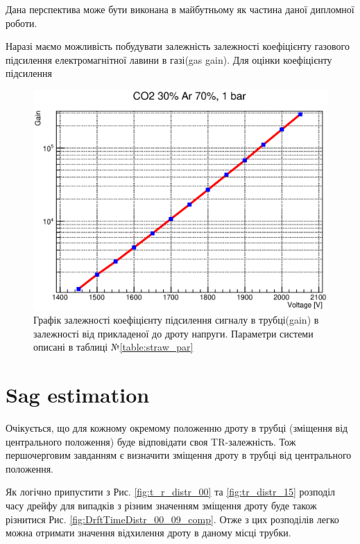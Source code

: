 \documentclass[]{article}
\begin{document}
	Дана перспектива може бути виконана в майбутньому як частина даної дипломної роботи.
	
	Наразі маємо можливість побудувати залежність залежності коефіцієнту газового підсилення електромагнітної лавини в газі(gas gain). Для оцінки коефіцієнту підсилення 
	
	\begin{figure}[h]
	\centering
	 \includegraphics[width=\textwidth]{gain_1450_2050V}
	\caption{ Графік залежності коефіцієнту підсилення сигналу в трубці(gain) в залежності від прикладеної до дроту напруги. Параметри системи описані в таблиці №\ref{table:straw_par}}
	\label{fig:gain_trought_voltage}
	\end{figure}
	
	\section{ Sag estimation}
	
	Очікується, що для кожному окремому положенню дроту в трубці (зміщення від центрального положення) буде відповідати своя TR-залежність. Тож першочерговим завданням є визначити зміщення дроту в  трубці від центрального положення.
	
	Як логічно припустити з Рис. \ref{fig:t_r_distr_00} та \ref{fig:tr_distr_15} розподіл часу дрейфу  для випадків з різним значенням зміщення дроту буде також різнитися Рис. \ref{fig:DrftTimeDistr_00_09_comp}.
	Отже з цих розподілів легко можна отримати значення відхилення дроту в даному місці трубки.
	
\end{document}
